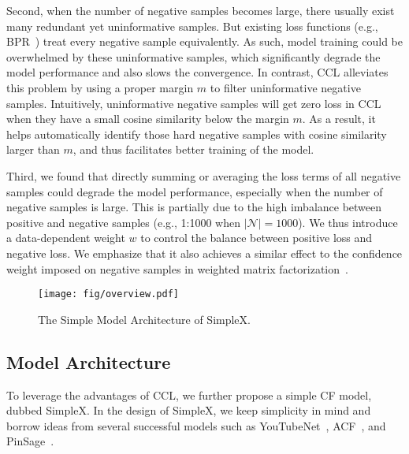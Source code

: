 \documentclass[sigconf,authorversion]{acmart}
\begin{document}
Second, when the number of negative samples becomes large, there usually exist many redundant yet uninformative samples. But existing loss functions (e.g., BPR~\cite{BPR}) treat every negative sample equivalently. As such, model training could be overwhelmed by these uninformative samples, which significantly degrade the model performance and also slows the convergence. In contrast, CCL alleviates this problem by using a proper margin $m$ to filter uninformative negative samples. Intuitively, uninformative negative samples will get zero loss in CCL when they have a small cosine similarity below the margin $m$. As a result, it helps automatically identify those hard negative samples with cosine similarity larger than $m$, and thus facilitates better training of the model. 

Third, we found that directly summing or averaging the loss terms of all negative samples could degrade the model performance, especially when the number of negative samples is large. This is partially due to the high imbalance between positive and negative samples (e.g., 1:1000 when $|\mathcal N|=1000$). We thus introduce a data-dependent weight $w$ to control the balance between positive loss and negative loss. We emphasize that it also achieves a similar effect to the confidence weight imposed on negative samples in weighted matrix factorization~\cite{WMF}.














\begin{figure}[!t]
    \begin{center}
\texttt{[image: fig/overview.pdf]}
    \end{center}
\caption{The Simple Model Architecture of SimpleX.}
    \label{fig:overview}
\end{figure}


\subsection{Model Architecture}
\label{simplecf}
To leverage the advantages of CCL, we further propose a simple CF model, dubbed SimpleX. In the design of SimpleX, we keep simplicity in mind and borrow ideas from several successful models such as YouTubeNet~\cite{YouTubeNet}, ACF~\cite{ACF}, and PinSage~\cite{PinSage}. 
\end{document}
